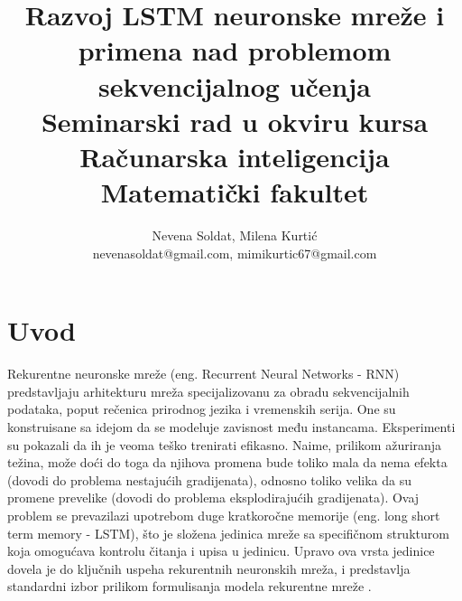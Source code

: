 \documentclass[a4paper]{article}
\begin{document}
\title{Razvoj LSTM neuronske mreže i primena nad problemom sekvencijalnog učenja\\ \small{Seminarski rad u okviru kursa\\Računarska inteligencija\\ Matematički fakultet}}

\author{Nevena Soldat, Milena Kurtić\\ nevenasoldat@gmail.com, mimikurtic67@gmail.com}


\maketitle


\tableofcontents

\newpage

\section{Uvod}
\label{sec:uvod}
Rekurentne neuronske mreže (eng. Recurrent Neural Networks - RNN) predstavljaju arhitekturu mreža specijalizovanu za obradu sekvencijalnih podataka, poput rečenica prirodnog jezika i vremenskih serija. One su konstruisane sa idejom da se modeluje zavisnost među instancama. Eksperimenti su pokazali da ih je veoma teško trenirati efikasno. Naime, prilikom ažuriranja težina, može doći do toga da njihova promena bude toliko mala da nema efekta (dovodi do problema nestajućih gradijenata), odnosno toliko velika da su promene prevelike (dovodi do problema eksplodirajućih gradijenata). Ovaj problem se prevazilazi upotrebom duge kratkoročne memorije (eng. long short term memory - LSTM), što je složena jedinica mreže sa specifičnom strukturom koja omogućava kontrolu čitanja i upisa u jedinicu. Upravo ova vrsta jedinice dovela je do ključnih uspeha rekurentnih neuronskih mreža, i predstavlja standardni izbor prilikom formulisanja modela rekurentne mreže \cite{matf}. 
\end{document}
